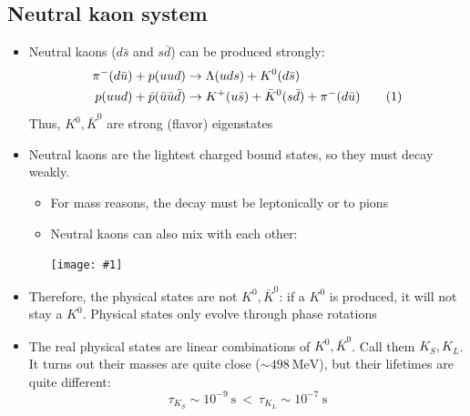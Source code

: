 \documentclass[11pt]{article}
\newcommand\numberthis{\addtocounter{equation}{1}\tag{\theequation}}
\newcommand{\ubar}{\bar{u}}
\newcommand{\sbar}{\bar{s}}
\newcommand{\dbar}{\bar{d}}
\newcommand{\s}{\text{s}}
\newcommand{\mev}{\text{MeV}}
\newcommand{\embedimgw}[2]{\begin{center}\texttt{[image: \#1]}\end{center}}
\begin{document}
  \subsection{Neutral kaon system}
  \begin{itemize}
    \item Neutral kaons ($d\sbar$ and $s\dbar$) can be produced strongly:
    \begin{align*}
      \pi^-(d\ubar) + p(uud) &\rightarrow \Lambda(uds)+K^0(d\sbar)\\
      p(uud)+\bar p(\ubar\ubar\dbar) &\rightarrow K^+(u\sbar) + \bar K^0 (s\dbar) + \pi^-(d\ubar)\numberthis
    \end{align*}
    Thus, $K^0,\bar K^0$ are strong (flavor) eigenstates
    \item Neutral kaons are the lightest charged bound states, so they must decay weakly.
    \begin{itemize}
      \item For mass reasons, the decay must be leptonically or to pions
      \item Neutral kaons can also mix with each other:
      \embedimgw{figs/kaonmixing.png}{.7}
    \end{itemize}
    \item Therefore, the physical states are not $K^0, \bar K^0$: if a $K^0$ is produced, it will not stay a $K^0$. Physical states only evolve through phase rotations
    \item The real physical states are linear combinations of $K^0,\bar K^0$. Call them $K_S,K_L$. It turns out their masses are quite close ($\sim 498~\mev$), but their lifetimes are quite different:
    \begin{equation}
      \tau_{K_S} \sim 10^{-9}~\s ~< ~\tau_{K_L} \sim 10^{-7}~\s
    \end{equation}
  \end{itemize}
\end{document}
